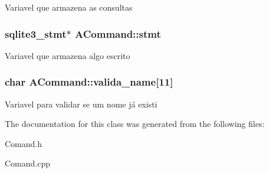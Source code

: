 Variavel que armazena as consultas \hypertarget{class_a_command_a7ecdb33c925dc75b9538a4009ff88c6c}{
\subsubsection[{stmt}]{\setlength{\rightskip}{0pt plus 5cm}sqlite3\-\_\-stmt$\ast$ A\-Command\-::stmt\hspace{0.3cm}{\ttfamily [protected]}}}\label{class_a_command_a7ecdb33c925dc75b9538a4009ff88c6c}
Variavel que armazena algo escrito \hypertarget{class_a_command_a92ecbf13bd3238cd74125505954d211f}{
\subsubsection[{valida\-\_\-name}]{\setlength{\rightskip}{0pt plus 5cm}char A\-Command\-::valida\-\_\-name\mbox{[}11\mbox{]}\hspace{0.3cm}{\ttfamily [protected]}}}\label{class_a_command_a92ecbf13bd3238cd74125505954d211f}
Variavel para validar se um nome já existi 

The documentation for this class was generated from the following files\-:\begin{DoxyCompactItemize}
\item 
Comand.\-h\item 
Comand.\-cpp\end{DoxyCompactItemize}
